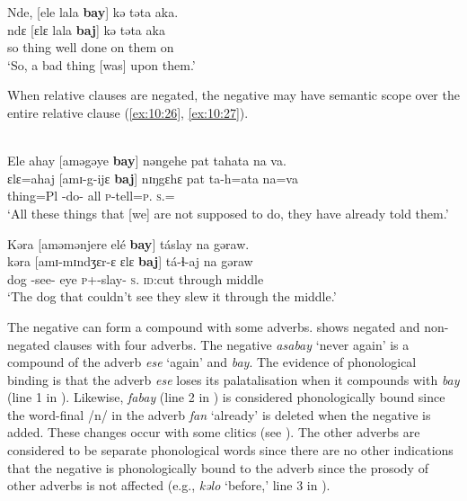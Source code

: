 \ea \label{ex:10:25}
Nde,  [ele  lala  \textbf{bay}]  kə  təta  aka.\\
\gll  ndɛ     [ɛlɛ   lala    \textbf{baj}]   kə   təta   aka\\
      so    thing  {well done}  {\NEG}  on  them  on\\
\glt  ‘So, a bad thing [was] upon them.’ 
\z

When relative clauses are negated, the negative may have semantic scope over the entire relative clause (\ref{ex:10:26}, \ref{ex:10:27}). 

\ea \label{ex:10:26}\\
Ele  ahay  [aməgəye  \textbf{bay}]  nəngehe  pat  tahata  na  va.\\
\gll  ɛlɛ=ahaj  [amɪ-g-ijɛ   \textbf{baj}]  nɪŋgɛhɛ  pat  ta-h=ata  na=va\\
      thing=Pl  {\DEP}-do-{\CL}  {\NEG}  {\DEM}  all  \textsc{p}-tell=\textsc{p}.{\IO}  \textsc{s}.{\DO}={\PRF}\\
\glt  ‘All these things that [we] are not supposed to do, they have already told them.’  
\z

\ea \label{ex:10:27}
Kəra  [aməmənjere  elé  \textbf{bay}]  táslay  na  gəraw.\\
\gll  kəra    [amɪ-mɪndʒɛr-ɛ  ɛlɛ  \textbf{baj}]  tá-ɬ{}-aj    na  gəraw\\
      dog    {\DEP}-see-{\CL}  eye  {\NEG}  \textsc{p}+{\IFV}-slay{}-{\CL}    \textsc{s}.{\DO}  {\textsc{id}:cut through middle}\\
\glt  ‘The dog that couldn’t see they slew it through the middle.’
\z

The negative can form a compound with some adverbs.  shows negated and non-negated clauses with four adverbs. The negative \textit{asabay} ‘never again’ is a compound of  the adverb \textit{ese} ‘again’ and \textit{bay}. The evidence of phonological binding is that the adverb \textit{ese}  loses its palatalisation when it compounds with \textit{bay} (line 1 in ). Likewise, \textit{fabay} (line 2 in ) is considered phonologically bound since the word-final /n/ in the adverb \textit{fan} ‘already’ is deleted when the negative is added. These changes occur with some clitics (see ). The other adverbs are considered to be separate phonological words since there are no other indications that the negative is phonologically bound to the adverb since the prosody of other adverbs is not affected (e.g., \textit{kəlo} ‘before,’ line 3 in ).  

